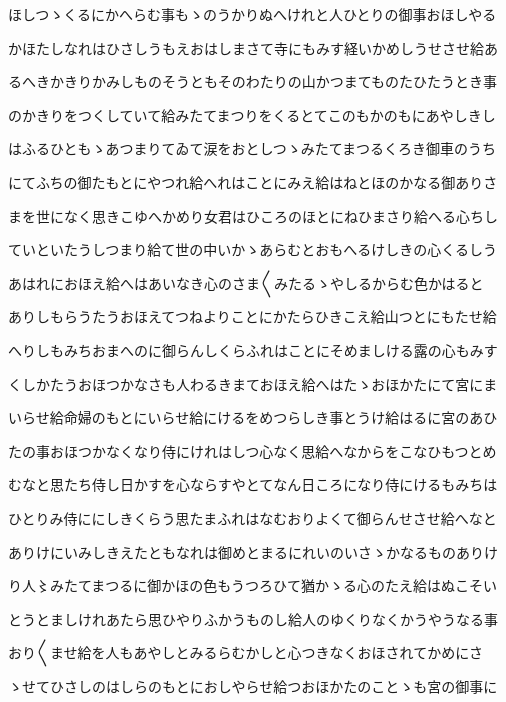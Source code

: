 \documentclass[a4paper,11pt,landscape]{ltjtarticle}
\begin{document}
ほしつゝくるにかへらむ事もゝのうかりぬへけれと人ひとりの御事おほしやる
\par\medskip
かほたしなれはひさしうもえおはしまさて寺にもみす経いかめしうせさせ給あ
\par\medskip
るへきかきりかみしものそうともそのわたりの山かつまてものたひたうとき事
\par\medskip
のかきりをつくしていて給みたてまつりをくるとてこのもかのもにあやしきし
\par\medskip
はふるひともゝあつまりてゐて涙をおとしつゝみたてまつるくろき御車のうち
\par\medskip
にてふちの御たもとにやつれ給へれはことにみえ給はねとほのかなる御ありさ
\par\medskip
まを世になく思きこゆへかめり女君はひころのほとにねひまさり給へる心ちし
\par\medskip
ていといたうしつまり給て世の中いかゝあらむとおもへるけしきの心くるしう
\par\medskip
あはれにおほえ給へはあいなき心のさま〱みたるゝやしるからむ色かはると
\par\medskip
ありしもらうたうおほえてつねよりことにかたらひきこえ給山つとにもたせ給
\par\medskip
へりしもみちおまへのに御らんしくらふれはことにそめましける露の心もみす
\par\medskip
くしかたうおほつかなさも人わるきまておほえ給へはたゝおほかたにて宮にま
\par\medskip
いらせ給命婦のもとにいらせ給にけるをめつらしき事とうけ給はるに宮のあひ
\par\medskip
たの事おほつかなくなり侍にけれはしつ心なく思給へなからをこなひもつとめ
\par\medskip
むなと思たち侍し日かすを心ならすやとてなん日ころになり侍にけるもみちは
\par\medskip
ひとりみ侍ににしきくらう思たまふれはなむおりよくて御らんせさせ給へなと
\par\medskip
ありけにいみしきえたともなれは御めとまるにれいのいさゝかなるものありけ
\par\medskip
り人〻みたてまつるに御かほの色もうつろひて猶かゝる心のたえ給はぬこそい
\par\medskip
とうとましけれあたら思ひやりふかうものし給人のゆくりなくかうやうなる事
\par\medskip
おり〱ませ給を人もあやしとみるらむかしと心つきなくおほされてかめにさ
\par\medskip
ゝせてひさしのはしらのもとにおしやらせ給つおほかたのことゝも宮の御事に
\par\medskip
\end{document}
